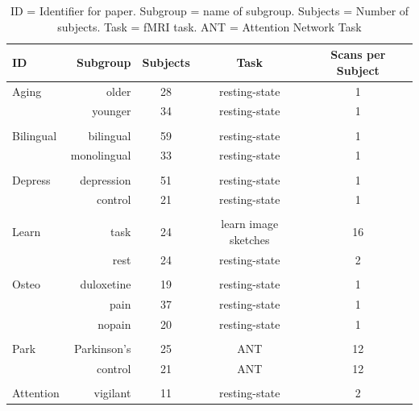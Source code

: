 \documentclass[12pt]{spieman}  %
\begin{document}
\begin{spacing}{2}
\begin{table}[h!]
\caption{
    ID = Identifier for paper. Subgroup = name of subgroup. Subjects = Number of subjects.
    Task = fMRI task. ANT = Attention Network Task \cite{fanActivationAttentionalNetworks2005}
}
\label{tab:data-subjects}
\small
\centering
\begin{tabular}{ l r c c c }
\hline
\textbf{ID}  & \textbf{Subgroup}  & \textbf{Subjects}  & \textbf{Task} & \textbf{Scans per Subject} \\
\hline
Aging   &  older             & 28      & resting-state        & 1 \\
        &  younger           & 34      & resting-state        & 1 \\
        &                    &         &                      &   \\
Bilingual  &  bilingual          & 59      & resting-state    & 1 \\
        &  monolingual        & 33      & resting-state       & 1 \\
        &                    &         &                      &   \\
Depress &  depression         & 51      & resting-state       & 1 \\
        &  control            & 21      & resting-state       & 1 \\
        &                    &         &                      &   \\
Learn   &  task              & 24      & learn image sketches & 16\\
        &  rest              & 24      & resting-state        & 2 \\
        &                    &         &                      &   \\
Osteo   &  duloxetine        & 19      & resting-state        & 1 \\
        &  pain              & 37      & resting-state        & 1 \\
        &  nopain            & 20      & resting-state        & 1 \\
        &                    &         &                      &   \\
Park    &  Parkinson's       & 25      & ANT                  & 12\\
        &  control           & 21      & ANT                  & 12\\
        &                    &         &                      &   \\
Attention&  vigilant           & 11     & resting-state       & 2 \\

\end{tabular}
\end{table}
\end{spacing}
\end{document}
